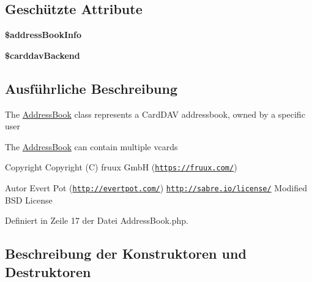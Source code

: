 \subsection*{Geschützte Attribute}
\begin{DoxyCompactItemize}
\item 
\mbox{\label{class_sabre_1_1_card_d_a_v_1_1_address_book_a64ad6976b292e6d0030e11ac7617dc5a}} 
{\bfseries \$address\+Book\+Info}
\item 
\mbox{\label{class_sabre_1_1_card_d_a_v_1_1_address_book_a87bb3fd9cbfd56b88892b6180c4cfe21}} 
{\bfseries \$carddav\+Backend}
\end{DoxyCompactItemize}


\subsection{Ausführliche Beschreibung}
The \mbox{\hyperlink{class_sabre_1_1_card_d_a_v_1_1_address_book}{Address\+Book}} class represents a Card\+D\+AV addressbook, owned by a specific user

The \mbox{\hyperlink{class_sabre_1_1_card_d_a_v_1_1_address_book}{Address\+Book}} can contain multiple vcards

\begin{DoxyCopyright}{Copyright}
Copyright (C) fruux GmbH (\href{https://fruux.com/}{\tt https\+://fruux.\+com/}) 
\end{DoxyCopyright}
\begin{DoxyAuthor}{Autor}
Evert Pot (\href{http://evertpot.com/}{\tt http\+://evertpot.\+com/})  \href{http://sabre.io/license/}{\tt http\+://sabre.\+io/license/} Modified B\+SD License 
\end{DoxyAuthor}


Definiert in Zeile 17 der Datei Address\+Book.\+php.



\subsection{Beschreibung der Konstruktoren und Destruktoren}
\mbox{\label{class_sabre_1_1_card_d_a_v_1_1_address_book_a7d963d32490fa2a8495cadc491f4c964}} 
